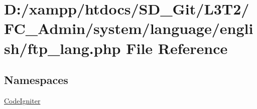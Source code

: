 \hypertarget{_admin_2system_2language_2english_2ftp__lang_8php}{}\section{D\+:/xampp/htdocs/\+S\+D\+\_\+\+Git/\+L3\+T2/\+F\+C\+\_\+\+Admin/system/language/english/ftp\+\_\+lang.php File Reference}
\label{_admin_2system_2language_2english_2ftp__lang_8php}
\subsection*{Namespaces}
\begin{DoxyCompactItemize}
\item 
 \hyperlink{namespace_code_igniter}{Code\+Igniter}
\end{DoxyCompactItemize}
